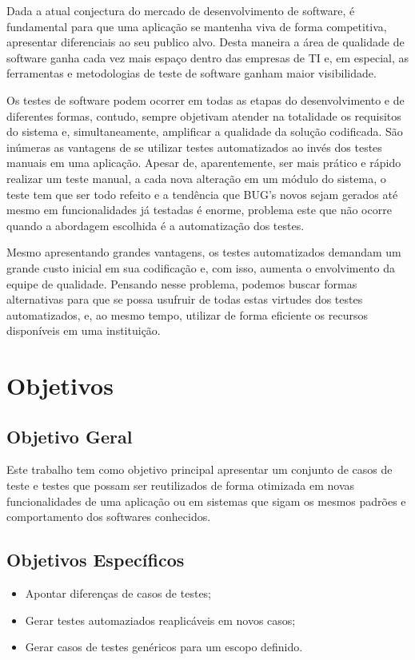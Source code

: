 \documentclass[12pt]{article}
\begin{document}
	Dada a atual conjectura do mercado de desenvolvimento de software, é fundamental para
	que uma aplicação se mantenha viva de forma competitiva, apresentar diferenciais ao seu publico alvo. Desta
	maneira a área de qualidade de software ganha cada vez mais espaço dentro das empresas de TI e, em especial, as ferramentas e
	metodologias de teste de software ganham maior visibilidade.
	
	Os testes de software podem ocorrer em todas as etapas do desenvolvimento e de diferentes formas, contudo,
	sempre objetivam atender na totalidade os requisitos do sistema e, simultaneamente, amplificar a qualidade da solução
	codificada. São inúmeras as vantagens de se utilizar testes automatizados ao invés dos testes manuais em uma aplicação.
	Apesar de, aparentemente, ser mais prático e rápido realizar um teste manual, a cada nova alteração em um módulo do sistema,
	o teste tem que ser todo refeito e a tendência que BUG's novos sejam gerados até mesmo em funcionalidades já testadas é enorme,
	problema este que não ocorre quando a abordagem escolhida é a automatização dos testes.
	
	Mesmo apresentando grandes vantagens, os testes automatizados demandam um grande custo inicial em sua codificação e, com isso, aumenta o 
	envolvimento da equipe de qualidade. Pensando nesse problema, podemos buscar formas alternativas para
	que se possa usufruir de todas estas virtudes dos testes automatizados, e, ao mesmo tempo, utilizar de forma eficiente os
	recursos disponíveis em uma instituição.
	
	\section{Objetivos}
	
	\subsection{Objetivo Geral}
	
	Este trabalho tem como objetivo principal apresentar um conjunto de casos de teste e testes que possam ser reutilizados de
	forma otimizada em novas funcionalidades de uma aplicação ou em sistemas que sigam os mesmos padrões e comportamento dos
	softwares conhecidos.
	
	\subsection{Objetivos Específicos}
	\begin{itemize}
		\item Apontar diferenças de casos de testes;
		\item Gerar testes automaziados reaplicáveis em novos casos;
		\item Gerar casos de testes genéricos para um escopo definido.
	\end{itemize}
	
\end{document}
